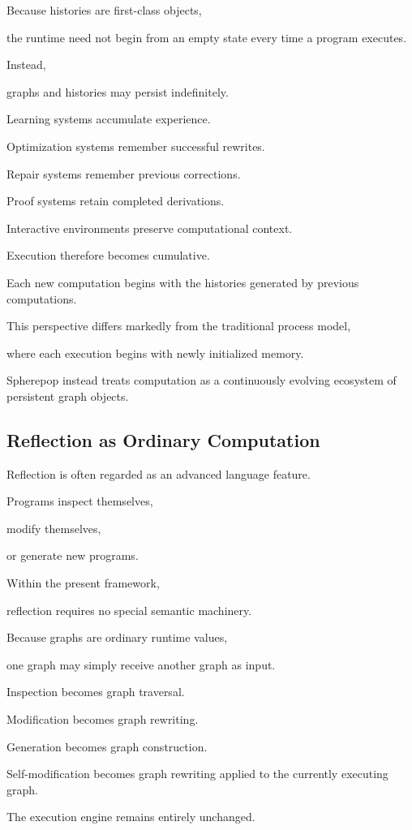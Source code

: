\documentclass[12pt,oneside]{article}
\begin{document}
Because histories are first-class objects,

the runtime need not begin from an empty state every time a program executes.

Instead,

graphs and histories may persist indefinitely.

Learning systems accumulate experience.

Optimization systems remember successful rewrites.

Repair systems remember previous corrections.

Proof systems retain completed derivations.

Interactive environments preserve computational context.

Execution therefore becomes cumulative.

Each new computation begins with the histories generated by previous computations.

This perspective differs markedly from the traditional process model,

where each execution begins with newly initialized memory.

Spherepop instead treats computation as a continuously evolving ecosystem of persistent graph objects.

\subsection{Reflection as Ordinary Computation}

Reflection is often regarded as an advanced language feature.

Programs inspect themselves,

modify themselves,

or generate new programs.

Within the present framework,

reflection requires no special semantic machinery.

Because graphs are ordinary runtime values,

one graph may simply receive another graph as input.

Inspection becomes graph traversal.

Modification becomes graph rewriting.

Generation becomes graph construction.

Self-modification becomes graph rewriting applied to the currently executing graph.

The execution engine remains entirely unchanged.
\end{document}
